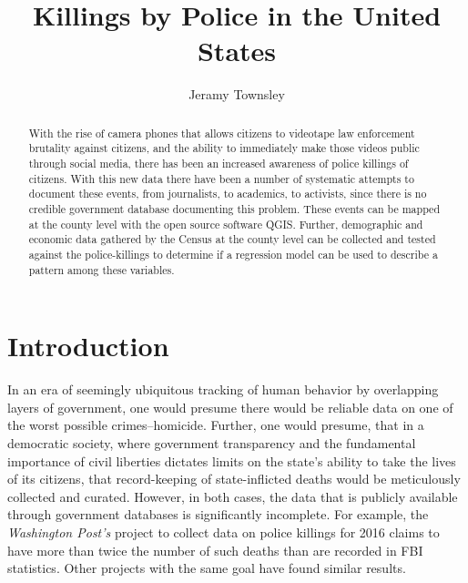 \documentclass[sigconf]{acmart}
\begin{document}
\title{Killings by Police in the United States}

\author{Jeramy Townsley}


\begin{abstract}
With the rise of camera phones that allows citizens to videotape law enforcement brutality against citizens, and the ability to immediately make those videos public through social media, there has been an increased awareness of police killings of citizens.  With this new data there have been a number of systematic attempts to document these events, from journalists, to academics, to activists, since there is no credible government database documenting this problem. These events can be mapped at the county level with the open source software QGIS.  Further, demographic and economic data gathered by the Census at the county level can be collected and tested against the police-killings to determine if a regression model can be used to describe a pattern among these variables. 
\end{abstract}


\maketitle

\section{Introduction}

In an era of seemingly ubiquitous tracking of human behavior by  overlapping layers of government, one would presume there would be reliable data on one of the worst possible crimes--homicide. Further, one would presume, that in a democratic society, where government transparency and the fundamental importance of civil liberties dictates limits on the state's ability to take the lives of its citizens, that record-keeping of state-inflicted deaths would be meticulously collected and curated. \cite{brucato15} However, in both cases, the data that is publicly available through government databases is significantly incomplete. \cite{currie16, pridemore05,dalton17,nix17} For example, the {\em Washington Post's} project to collect data on police killings for 2016 claims to have more than twice the number of such deaths than are recorded in FBI statistics. \cite{fatalforce}  Other projects with the same goal have found similar results. \cite{policeviolence,counted} 
\end{document}
